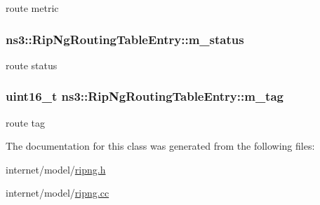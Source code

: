 route metric 

\subsubsection[{\texorpdfstring{m\+\_\+status}{m_status}}]{ ns3\+::\+Rip\+Ng\+Routing\+Table\+Entry\+::m\+\_\+status\hspace{0.3cm}{\ttfamily [private]}}\hypertarget{classns3_1_1RipNgRoutingTableEntry_ac8fd0bb518d91ae1369d51ce47497159}{}\label{classns3_1_1RipNgRoutingTableEntry_ac8fd0bb518d91ae1369d51ce47497159}


route status 

\subsubsection[{\texorpdfstring{m\+\_\+tag}{m_tag}}]{\setlength{\rightskip}{0pt plus 5cm}uint16\+\_\+t ns3\+::\+Rip\+Ng\+Routing\+Table\+Entry\+::m\+\_\+tag\hspace{0.3cm}{\ttfamily [private]}}\hypertarget{classns3_1_1RipNgRoutingTableEntry_a7847d5c3a75d51734422ae04a7334b4b}{}\label{classns3_1_1RipNgRoutingTableEntry_a7847d5c3a75d51734422ae04a7334b4b}


route tag 



The documentation for this class was generated from the following files\+:\begin{DoxyCompactItemize}
\item 
internet/model/\hyperlink{ripng_8h}{ripng.\+h}\item 
internet/model/\hyperlink{ripng_8cc}{ripng.\+cc}\end{DoxyCompactItemize}
